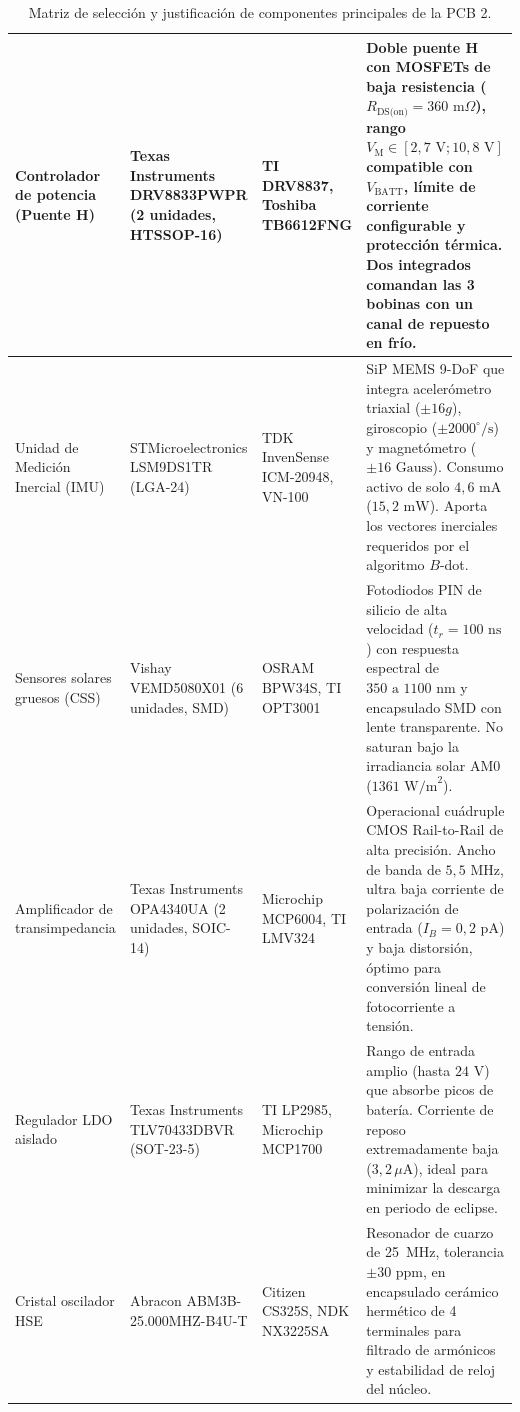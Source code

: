 \documentclass[11pt,a4paper]{article}
\begin{document}
\begin{table}[H]
\begin{tabularx}{\textwidth}{|p{2.2cm}|p{3.1cm}|p{2.8cm}|X|}
Controlador de potencia (Puente H) & Texas Instruments DRV8833PWPR (2 unidades, HTSSOP-16) & TI DRV8837, Toshiba TB6612FNG & Doble puente H con MOSFETs de baja resistencia ($R_{\text{DS(on)}} = 360\text{ m}\Omega$), rango $V_{\text{M}} \in [2{,}7\text{ V}; 10{,}8\text{ V}]$ compatible con $V_{\text{BATT}}$, límite de corriente configurable y protección térmica. Dos integrados comandan las 3 bobinas con un canal de repuesto en frío. \\ \hline
Unidad de Medición Inercial (IMU) & STMicroelectronics LSM9DS1TR (LGA-24) & TDK InvenSense ICM-20948, VN-100 & SiP MEMS 9-DoF que integra acelerómetro triaxial ($\pm 16g$), giroscopio ($\pm 2000^\circ/\text{s}$) y magnetómetro ($\pm 16\text{ Gauss}$). Consumo activo de solo $4{,}6\text{ mA}$ ($15{,}2\text{ mW}$). Aporta los vectores inerciales requeridos por el algoritmo $B$-dot. \\ \hline
Sensores solares gruesos (CSS) & Vishay VEMD5080X01 (6 unidades, SMD) & OSRAM BPW34S, TI OPT3001 & Fotodiodos PIN de silicio de alta velocidad ($t_r = 100\text{ ns}$) con respuesta espectral de $350\text{ a }1100\text{ nm}$ y encapsulado SMD con lente transparente. No saturan bajo la irradiancia solar AM0 ($1361\text{ W/m}^2$). \\ \hline
Amplificador de transimpedancia & Texas Instruments OPA4340UA (2 unidades, SOIC-14) & Microchip MCP6004, TI LMV324 & Operacional cuádruple CMOS Rail-to-Rail de alta precisión. Ancho de banda de $5{,}5\text{ MHz}$, ultra baja corriente de polarización de entrada ($I_B = 0{,}2\text{ pA}$) y baja distorsión, óptimo para conversión lineal de fotocorriente a tensión. \\ \hline
Regulador LDO aislado & Texas Instruments TLV70433DBVR (SOT-23-5) & TI LP2985, Microchip MCP1700 & Rango de entrada amplio (hasta $24\text{ V}$) que absorbe picos de batería. Corriente de reposo extremadamente baja ($3{,}2\,\mu\text{A}$), ideal para minimizar la descarga en periodo de eclipse. \\ \hline
Cristal oscilador HSE & Abracon ABM3B-25.000MHZ-B4U-T & Citizen CS325S, NDK NX3225SA & Resonador de cuarzo de 25~MHz, tolerancia $\pm 30\text{ ppm}$, en encapsulado cerámico hermético de 4 terminales para filtrado de armónicos y estabilidad de reloj del núcleo. \\ \hline
\end{tabularx}
\caption{Matriz de selección y justificación de componentes principales de la PCB 2.}
\label{tab:comp}
\end{table}
\end{document}

